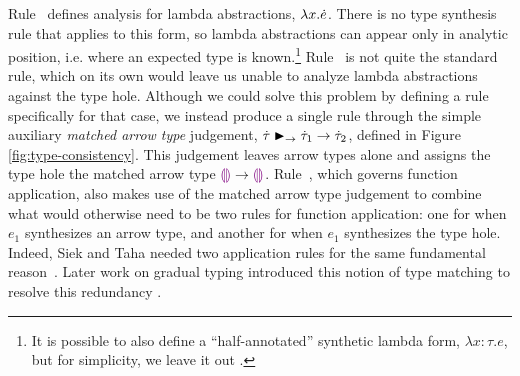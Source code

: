 Rule~ defines analysis for lambda abstractions,
$\lambda x.\dot{e}$. There is no type synthesis rule that applies  
to this form, so lambda abstractions can appear only in analytic position,
i.e. where an expected type is known.\footnote{It is possible to also define a
  ``half-annotated'' synthetic lambda form, $\lambda x{:}\tau.e$, but for
  simplicity, we leave it out \citep{DBLP:conf/tldi/ChlipalaPH05}.}  Rule~ is not quite the standard rule,
%
which on its own would leave us unable to analyze
lambda abstractions against the type hole.
Although we could solve this problem by defining a rule 
specifically for that case, we 
instead produce a single rule through the
simple auxiliary \emph{matched arrow type} judgement,
$\dot{\tau} \blacktriangleright_{\rightarrow} \dot{\tau}_1 \rightarrow \dot{\tau}_2$, defined in Figure
\ref{fig:type-consistency}. This judgement leaves arrow types alone and
assigns the type hole the matched arrow type $\textcolor{violet}{\llparenthesis}\textcolor{violet}{\rrparenthesis} \rightarrow \textcolor{violet}{\llparenthesis}\textcolor{violet}{\rrparenthesis}$.  
Rule~, which governs function
application, also makes use of the matched arrow type judgement to
combine what would otherwise need to be two rules for function application:
one for when $e_1$ synthesizes an arrow type, and another for when $e_1$
synthesizes the type hole. Indeed, Siek and Taha needed two application
rules for the same fundamental reason~\citep{Siek06a}. Later work on gradual
typing introduced this notion of type matching to resolve this redundancy \citep{DBLP:conf/popl/CiminiS16,DBLP:conf/popl/GarciaC15,DBLP:conf/popl/RastogiCH12}.


